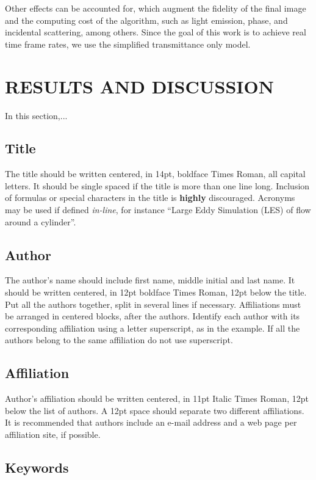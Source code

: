 \documentclass[oneside,a4paper,english,links]{amca}
\begin{document}
Other effects can be accounted for, which augment the fidelity of the
final image and the computing cost of the algorithm, such as light
emission, phase, and incidental scattering, among others. Since the
goal of this work is to achieve real time frame rates, we use the
simplified transmittance only model.

\section{RESULTS AND DISCUSSION}

In this section,...



\subsection{Title}

The title should be written centered, in 14pt, boldface Times Roman,
all capital letters. It should be single spaced if the title is more
than one line long. Inclusion of formulas or special characters in the
title is \textbf{highly} discouraged. Acronyms may be used if defined
\emph{in-line}, for instance ``Large Eddy Simulation (LES) of
flow around a cylinder''.

\subsection{Author}

The author's name should include first name, middle initial and last
name. It should be written centered, in 12pt boldface Times Roman,
12pt below the title. Put all the authors together, split in several
lines if necessary. Affiliations must be arranged in centered blocks,
after the authors. Identify each author with its corresponding
affiliation using a letter superscript, as in the example. If all the
authors belong to the same affiliation do not use superscript. 

\subsection{Affiliation}

Author's affiliation should be written centered, in 11pt Italic Times Roman,
12pt below the list of authors. A 12pt space should separate two
different affiliations. It is recommended that authors include an
e-mail address and a web page per affiliation site, if possible. 

\subsection{Keywords}
\end{document}

